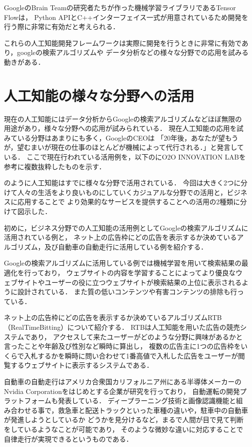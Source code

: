 GoogleのBrain Teamの研究者たちが作った機械学習ライブラリであるTensor Flowは，
Python APIとC++インターフェイス一式が用意されているため開発を行う際に非常に有効だと考えられる．

これらの人工知能開発フレームワークは実際に開発を行うときに非常に有効であり，googleの検索アルゴリズムや
データ分析などの様々な分野での応用を試みる動きがある．

\section{人工知能の様々な分野への活用}
現在の人工知能にはデータ分析からGoogleの検索アルゴリズムなどほぼ無限の用途があり，様々な分野への応用が試みられている．
現在人工知能の応用を試みている分野はあまりにも多く，GoogleのCEOは
「20年後，あなたが望もうが，望むまいが現在の仕事のほとんどが機械によって代行される．」\cite{ceo}と発言している．
ここで現在行われている活用例を，以下のにO2O INNOVATION LAB\cite{lab}を参考に複数抜粋したものを示す．


のように人工知能はすでに様々な分野で活用されている．
今回は大きく2つに分けて人々の生活をより良いものにしていくカジュアルな分野での活用と，ビジネスに応用することで
より効果的なサービスを提供することへの活用の2種類に分けて図示した．

初めに，ビジネス分野での人工知能の活用例としてGoogleの検索アルゴリズムに活用されている例と，
ネット上の広告枠にどの広告を表示するか決めているアルゴリズム，及び自動車の自動走行に活用している例を紹介する．

Googleの検索アルゴリズムに活用している例では機械学習を用いて検索結果の最適化を行っており，
ウェブサイトの内容を学習することによってより優良なウェブサイトやユーザーの役に立つウェブサイトが検索結果の上位に表示されるように設計されている．
また質の低いコンテンツや有害コンテンツの排除も行っている．

ネット上の広告枠にどの広告を表示するか決めているアルゴリズムRTB（RealTimeBitting）について紹介する．
RTBは人工知能を用いた広告の競売システムであり，
アクセスして来たユーザーがどのような分野に興味があるかと言ったことや年齢及び性別など瞬時に算出し，
複数の広告主に1つの広告枠をいくらで入札するかを瞬時に問い合わせて1番高値で入札した広告をユーザーが閲覧するウェブサイトに表示するシステムである．

自動車の自動走行はアメリカ合衆国カリフォルニア州にある半導体メーカーのNvidia Corporationをはじめとする企業が研究を行っており，
自動運転の開発プラットフォームも発表している．
ディープラーニング技術と画像認識機能と組み合わせる事で，救急車と配送トラックといった車種の違いや，駐車中の自動車が発進しようとしているか
どうかを見分けるなど，まるで人間が目で見て判断をしているようなことが可能であり，
そのような微妙な違いに対応することで自律走行が実現できるというものである．

